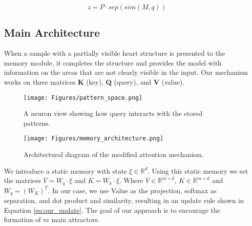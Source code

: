 \documentclass[preprint,12pt]{elsarticle}
\newcommand*{\updatedText}[1]{\textcolor{black}{ #1}}
\begin{document}
\begin{equation}
    z = P \cdot sep (sim(M, q))
    \label{eq:universal_separation}
\end{equation}

\subsection{Main Architecture}
When a sample with a partially visible heart structure is presented to the memory module, it completes the structure and provides the model with information on the areas that are not clearly visible in the input. Our mechanism works on three matrices \textbf{K} (key), \textbf{Q} (query), and \textbf{V} (value).


\begin{figure*}[!ht]
\centering
\texttt{[image: Figures/pattern\_space.png]}
\caption{A neuron view showing how query interacts with the stored patterns.}
\label{fig:neuron_view}
\end{figure*}


\begin{figure*}[!ht]
\centering
\texttt{[image: Figures/memory\_architecture.png]}
\caption{Architectural diagram of the modified attention mechanism.}
\label{fig:architecture_diagram}
\end{figure*}

We introduce a static memory with state $\xi \in \mathbb{R}^d$. Using this static memory we set the matrices $V = W_q \cdot \xi$ and $K = W_k \cdot \xi$. Where $V \in \mathbb{R}^{m\times d}$, $K \in \mathbb{R}^{m \times d}$ and $W_q = (W_K)^T$. In our case, we use Value as the projection, softmax as separation, and dot product and similarity, resulting in an update rule shown in Equation \ref{eq:our_update}. The goal of our approach is to encourage the formation of $m$ main attractors.
\end{document}
